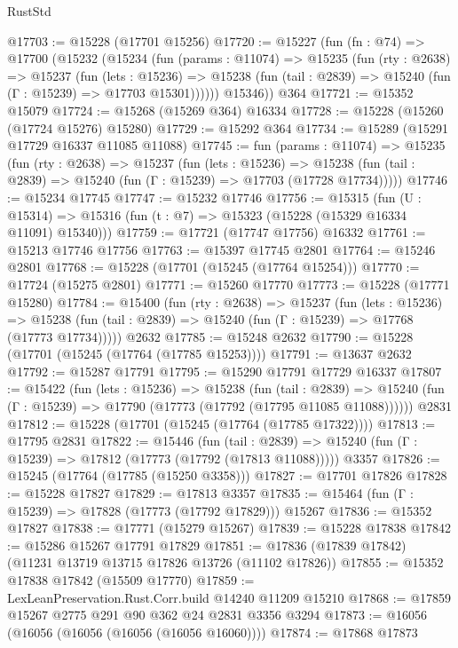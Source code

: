 \begin{lexlean}{RustStd}
\begin{coremodule}
@17703 := @15228 (@17701 @15256)
@17720 := @15227
    (fun (fn : @74) =>
    @17700
      (@15232
        (@15234
          (fun (params : @11074) =>
          @15235
            (fun (rty : @2638) =>
            @15237
              (fun (lets : @15236) =>
              @15238 (fun (tail : @2839) => @15240 (fun (Γ : @15239) => @17703 @15301))))))
        @15346))
    @364
@17721 := @15352 @15079
@17724 := @15268 (@15269 @364) @16334
@17728 := @15228 (@15260 (@17724 @15276) @15280)
@17729 := @15292 @364
@17734 := @15289 (@15291 @17729 @16337 @11085 @11088)
@17745 := fun (params : @11074) =>
  @15235
    (fun (rty : @2638) =>
    @15237
      (fun (lets : @15236) =>
      @15238 (fun (tail : @2839) => @15240 (fun (Γ : @15239) => @17703 (@17728 @17734)))))
@17746 := @15234 @17745
@17747 := @15232 @17746
@17756 := @15315
    (fun (U : @15314) => @15316 (fun (t : @7) => @15323 (@15228 (@15329 @16334 @11091) @15340)))
@17759 := @17721 (@17747 @17756) @16332
@17761 := @15213 @17746 @17756
@17763 := @15397 @17745 @2801
@17764 := @15246 @2801
@17768 := @15228 (@17701 (@15245 (@17764 @15254)))
@17770 := @17724 (@15275 @2801)
@17771 := @15260 @17770
@17773 := @15228 (@17771 @15280)
@17784 := @15400
    (fun (rty : @2638) =>
    @15237
      (fun (lets : @15236) =>
      @15238 (fun (tail : @2839) => @15240 (fun (Γ : @15239) => @17768 (@17773 @17734)))))
    @2632
@17785 := @15248 @2632
@17790 := @15228 (@17701 (@15245 (@17764 (@17785 @15253))))
@17791 := @13637 @2632
@17792 := @15287 @17791
@17795 := @15290 @17791 @17729 @16337
@17807 := @15422
    (fun (lets : @15236) =>
    @15238
      (fun (tail : @2839) =>
      @15240 (fun (Γ : @15239) => @17790 (@17773 (@17792 (@17795 @11085 @11088))))))
    @2831
@17812 := @15228 (@17701 (@15245 (@17764 (@17785 @17322))))
@17813 := @17795 @2831
@17822 := @15446
    (fun (tail : @2839) => @15240 (fun (Γ : @15239) => @17812 (@17773 (@17792 (@17813 @11088)))))
    @3357
@17826 := @15245 (@17764 (@17785 (@15250 @3358)))
@17827 := @17701 @17826
@17828 := @15228 @17827
@17829 := @17813 @3357
@17835 := @15464 (fun (Γ : @15239) => @17828 (@17773 (@17792 @17829))) @15267
@17836 := @15352 @17827
@17838 := @17771 (@15279 @15267)
@17839 := @15228 @17838
@17842 := @15286 @15267 @17791 @17829
@17851 := @17836 (@17839 @17842) (@11231 @13719 @13715 @17826 @13726 (@11102 @17826))
@17855 := @15352 @17838 @17842 (@15509 @17770)
@17859 := LexLeanPreservation.Rust.Corr.build @14240 @11209 @15210
@17868 := @17859 @15267 @2775 @291 @90 @362 @24 @2831 @3356 @3294
@17873 := @16056 (@16056 (@16056 (@16056 (@16056 @16060))))
@17874 := @17868 @17873

\end{coremodule}
\end{lexlean}
